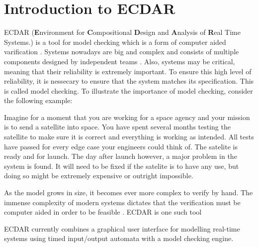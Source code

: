 \section{Introduction to ECDAR}\label{sec:introduction-to-ecdar}
\commondisclaimer


ECDAR (\textbf{E}nvironment for \textbf{C}ompositional \textbf{D}esign and \textbf{A}nalysis of \textbf{R}eal Time Systems.)
 is a tool for model checking \cite{ecdartheory} which is a form of computer aided varification \cite{modelchecking_handbook}.
Systems nowadays are big and complex and consists of multiple components designed by independent teams \cite{ecdartheory}. 
Also, systems may be critical, meaning that their reliability is extremely important. 
To ensure this high level of reliability, it is nessecary to ensure that the system matches its specification.
This is called model checking.
To illustrate the importance of model checking, consider the following example:

Imagine for a moment that you are working for a space agency and your mission is to send a satellite into space.
You have spent several months testing the satellite to make sure it is correct and everything is working as intended.
All tests have passed for every edge case your engineers could think of.
The satelite is ready and for launch.
The day after launch however, a major problem in the system is found. 
It will need to be fixed if the satelite is to have any use, but doing so might be extremely expensive or outright impossible.

As the model grows in size, it becomes ever more complex to verify by hand.
The immense complexity of modern systems dictates that the verification must be computer aided in order to be feasible \cite{modelchecking_handbook}. ECDAR is one such tool

ECDAR currently combines a graphical user interface for modelling real-time systems using timed input/output automata with a model checking engine.








